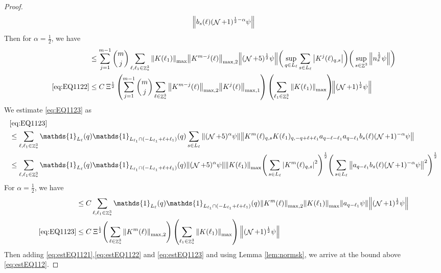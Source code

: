 \documentclass[sn-mathphys, Numbered ,a4paper]{sn-jnl}%
\DeclareMathOperator{\Z}{\mathbb{Z}}
\DeclareMathOperator{\NN}{\mathcal{N}}
\newcommand{\half}{\frac{1}{2}}
\theoremstyle{plain}
\theoremstyle{definition}
\theoremstyle{remark}
\theoremstyle{plain}
\theoremstyle{definition}
\theoremstyle{remark}
\begin{document}
\begin{proof}
\begin{alignat}{2}
		\norm{  b_{s}(\ell)  (\NN+1)^{\half-\alpha} \psi }		
	\nonumber\\
\end{alignat}
Then for $\alpha = \half$, we have
\begin{align}
	&\leq  \sum\limits_{j=1}^{m-1} {{m}\choose j}\sum\limits_{\ell, \ell_1\in \Z^3_*}  \norm{K(\ell_1)}_{\mathrm{max}} \norm{K^{m-j}(\ell)}_{\mathrm{max,2}} \norm{ (\NN+5)^{\half} \psi} \bigg(\sup_{q \in L_{\ell}}\sum\limits_{s\in L_{\ell}}\abs{K^{j}(\ell)_{q,s}}\bigg) \bigg(
	\sup_{s \in \Z^3}\norm{  n_s^\half   \psi } \bigg)\nonumber\\
	\eqref{eq:EQ1122}&\leq C \: \Xi^\half \left(  \sum\limits_{j=1}^{m-1} {{m}\choose j} \sum\limits_{\ell \in \Z^3_*} \norm{K^{m-j}(\ell)}_{\mathrm{max,2}} \norm{ K^{j}(\ell)}_{\mathrm{max,1}}\right) \left( \sum\limits_{ \ell_1\in \Z^3_*}\norm{ K(\ell_1) }_{\mathrm{max}} \right)\!\! \norm{(\NN+1)^\half \psi } \label{eq:estEQ1122}
\end{align}
We estimate \eqref{eq:EQ1123} as 
\begin{align}
	&\eqref{eq:EQ1123}\nonumber\\
	&\leq\sum\limits_{\ell, \ell_1\in \Z^3_*} \mathds{1}_{L_{\ell}}(q) \mathds{1}_{L_{\ell_1}\cap(-L_{\ell_1}+\ell+\ell_1)}(q) \sum\limits_{s \in L_{\ell}} \norm{(\NN+5)^{\alpha} \psi}\norm{ K^m(\ell)_{q,s} K(\ell_1)_{q,-q+\ell+\ell_1} a_{q-\ell-\ell_1} a_{q-\ell_1} b_{s}(\ell) (\NN+1)^{-\alpha} \psi }\nonumber\nonumber\\
	&\leq\sum\limits_{\ell, \ell_1\in \Z^3_*} \mathds{1}_{L_{\ell}}(q) \mathds{1}_{L_{\ell_1}\cap(-L_{\ell_1}+\ell+\ell_1)}(q)\norm{(\NN+5)^{\alpha} \psi} \norm{K(\ell_1)}_{\mathrm{max}} \Bigg( \sum\limits_{s \in L_{\ell}} \abs{K^m(\ell)_{q,s}}^2\Bigg)^\half \Bigg(\sum\limits_{s \in L_{\ell}} \norm{ a_{q-\ell_1} b_s(\ell) (\NN+1)^{-\alpha} \psi  }^2\Bigg)^\half \nonumber\\
\end{align}
For $\alpha=\half$, we have
\begin{align}
	&\leq C\sum\limits_{\ell, \ell_1\in \Z^3_*} \mathds{1}_{L_{\ell}}(q) \mathds{1}_{L_{\ell_1}\cap(-L_{\ell_1}+\ell+\ell_1)}(q) \norm{K^m(\ell)}_{\mathrm{max,2}} \norm{K(\ell_1)}_{\mathrm{max}} \norm{a_{q-\ell_1} \psi } \norm{(\NN+1)^\half \psi}\nonumber\\
	\eqref{eq:EQ1123}&\leq C\: \Xi^\half   \Bigg( \sum\limits_{\ell\in \Z^3_*} \norm{K^m(\ell)}_{\mathrm{max,2}}\Bigg) \left(\sum\limits_{ \ell_1\in \Z^3_*} \norm{K(\ell_1)}_{\mathrm{max}} \right)  \norm{(\NN+1)^\half \psi}\label{eq:estEQ1123}
\end{align}
Then adding \eqref{eq:estEQ1121},\eqref{eq:estEQ1122} and \eqref{eq:estEQ1123} and using Lemma \ref{lem:normsk}, we arrive at the bound above \eqref{eq:estEQ112}.
\end{proof}
\end{document}

